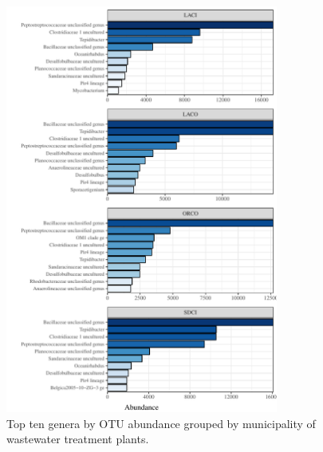 \documentclass[letterpaper,12pt]{article}\usepackage[]{graphicx}\usepackage[]{color}
\newenvironment{knitrout}{}{} %
\begin{document}
\begin{knitrout}
\color{fgcolor}\begin{figure}[!ht]

{\centering \includegraphics[width=0.8\textwidth]{figs/abundwwtp} 

}

\caption[Top ten genera by OTU abundance grouped by municipality of wastewater treatment plants]{Top ten genera by OTU abundance grouped by municipality of wastewater treatment plants.}\label{fig:abundwwtp}
\end{figure}


\end{knitrout}
\clearpage
\end{document}
